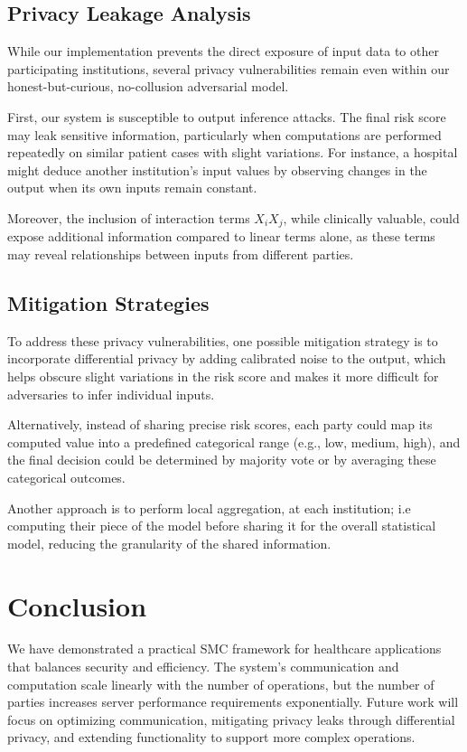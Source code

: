 \documentclass[10pt,conference,compsocconf]{IEEEtran}
\begin{document}
\subsection{Privacy Leakage Analysis}
While our implementation prevents the direct exposure of input data to other participating institutions, several privacy vulnerabilities remain even within our honest-but-curious, no-collusion adversarial model.

First, our system is susceptible to output inference attacks. The final risk score may leak sensitive information, particularly when computations are performed repeatedly on similar patient cases with slight variations. For instance, a hospital might deduce another institution's input values by observing changes in the output when its own inputs remain constant.

Moreover, the inclusion of interaction terms \(X_i X_j\), while clinically valuable, could expose additional information compared to linear terms alone, as these terms may reveal relationships between inputs from different parties.




\subsection{Mitigation Strategies}
To address these privacy vulnerabilities, one possible mitigation strategy is to incorporate differential privacy by adding calibrated noise to the output, which helps obscure slight variations in the risk score and makes it more difficult for adversaries to infer individual inputs. 

Alternatively, instead of sharing precise risk scores, each party could map its computed value into a predefined categorical range (e.g., low, medium, high), and the final decision could be determined by majority vote or by averaging these categorical outcomes. 

Another approach is to perform local aggregation, at each institution; i.e computing their piece of the model before sharing it for the overall statistical model, reducing the granularity of the shared information.









\section{Conclusion}
We have demonstrated a practical SMC framework for healthcare applications that balances security and efficiency. The system's communication and computation scale linearly with the number of operations, but the number of parties increases server performance requirements exponentially. Future work will focus on optimizing communication, mitigating privacy leaks through differential privacy, and extending functionality to support more complex operations.



\end{document}
